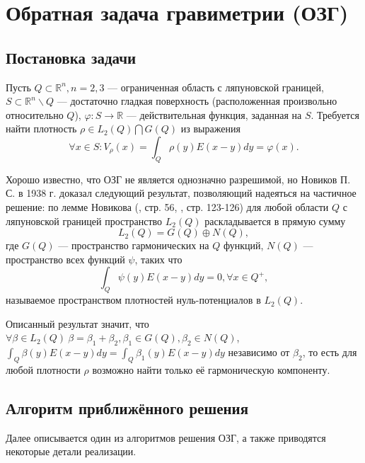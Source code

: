 \documentclass[a4paper, 12pt]{article}
\newcommand{\V}[1]{\int_Q #1(y) E(x-y) dy}
\newcommand{\R}[1]{\mathbb{R}^#1}
\begin{document}
\section{Обратная задача гравиметрии (ОЗГ)}
\subsection{Постановка задачи}
Пусть $Q\subset \R{n}, n=2,3$ --- ограниченная область с ляпуновской границей,
$S \subset \R{n}\backslash Q$ --- достаточно гладкая поверхность (расположенная произвольно относительно $Q$), $\varphi: S \rightarrow \mathbb{R}$ --- действительная функция, заданная на $S$.
Требуется найти плотность $\rho \in L_2(Q) \bigcap G(Q)$ из выражения
\begin{equation}
    \forall x \in S: V_\rho(x)= \V{\rho}= \varphi(x).
\end{equation}

Хорошо известно, что ОЗГ не является однозначно разрешимой, но Новиков П. С. в 1938 г. доказал следующий результат, позволяющий надеяться на частичное решение:
по лемме Новикова (\cite{lezh}, стр. 56, \cite{nov}, стр. 123-126) для любой области $Q$ с ляпуновской границей пространство $L_2(Q)$ раскладывается в прямую сумму 
\begin{equation}
    L_2(Q)= G(Q) \oplus N(Q),
\end{equation}
где $G(Q)$ --- пространство гармонических на $Q$ функций, $N(Q)$ --- пространство всех функций $\psi$, таких что
\begin{equation}
    \V{\psi}=0, \forall x\in Q^+,
\end{equation}
называемое пространством плотностей нуль-потенциалов в $L_2(Q)$.

Описанный результат значит, что $\forall \beta \in L_2(Q) \ \beta = \beta_1 + \beta_2, \beta_1 \in G(Q), \beta_2 \in N(Q)$, $\V{\beta}=\V{\beta_1}$ независимо от $\beta_2$, то есть для любой плотности $\rho$ возможно найти только её гармоническую компоненту.   


\subsection{Алгоритм приближённого решения}

Далее описывается один из алгоритмов решения ОЗГ, а также приводятся некоторые детали реализации.
\end{document}
